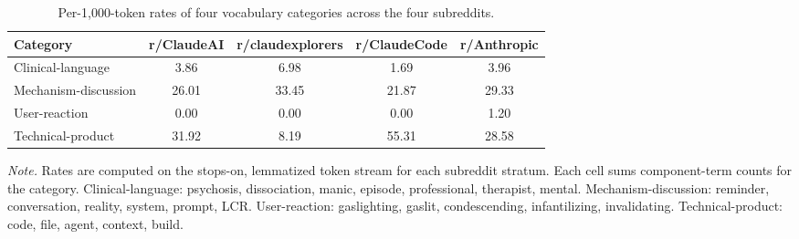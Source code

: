 \begin{table}[!htbp]
\centering
\caption{Per-1{,}000-token rates of four vocabulary categories across the four subreddits.}
\label{tab:vocab_rates}
\small
\begin{tabular}{lcccc}
\toprule
\textbf{Category} & \textbf{r/ClaudeAI} & \textbf{r/claudexplorers} & \textbf{r/ClaudeCode} & \textbf{r/Anthropic} \\
\midrule
Clinical-language & 3.86 & 6.98 & 1.69 & 3.96 \\
Mechanism-discussion & 26.01 & 33.45 & 21.87 & 29.33 \\
User-reaction & 0.00 & 0.00 & 0.00 & 1.20 \\
Technical-product & 31.92 & 8.19 & 55.31 & 28.58 \\
\bottomrule
\end{tabular}

\vspace{0.5em}
\raggedright
\textit{Note.} Rates are computed on the stops-on, lemmatized token stream for each subreddit stratum. Each cell sums component-term counts for the category. Clinical-language: psychosis, dissociation, manic, episode, professional, therapist, mental. Mechanism-discussion: reminder, conversation, reality, system, prompt, LCR. User-reaction: gaslighting, gaslit, condescending, infantilizing, invalidating. Technical-product: code, file, agent, context, build.
\end{table}
